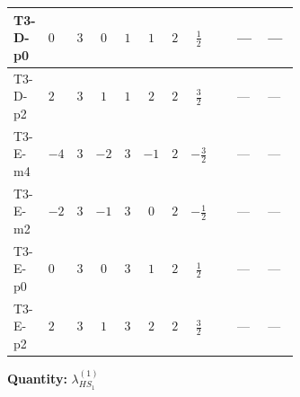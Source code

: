 \documentclass[8pt]{article}
\begin{document}
\begin{landscape}
\begin{longtable}{@{}llcccccc >{\raggedright\arraybackslash}p{0.21\linewidth} >{\raggedright\arraybackslash}p{0.21\linewidth} >{\raggedright\arraybackslash}p{0.21\linewidth}@{}}
\midrule
T3-D-p0 & $0$ & $3$ & $0$ & $1$ & $1$ & $2$ & $\frac{1}{2}$ & \scriptsize\adjustbox{max width=\linewidth}{$\begin{gathered} +8 {\lambda_{HS_1}^{(1)}} {\lambda_{S_1}^{(1)}}\end{gathered}$} & --- & --- \\
\midrule
T3-D-p2 & $2$ & $3$ & $1$ & $1$ & $2$ & $2$ & $\frac{3}{2}$ & \scriptsize\adjustbox{max width=\linewidth}{$\begin{gathered} +8 {\lambda_{HS_1}^{(1)}} {\lambda_{S_1}^{(1)}}\end{gathered}$} & --- & --- \\
\midrule
T3-E-m4 & $-4$ & $3$ & $-2$ & $3$ & $-1$ & $2$ & $-\frac{3}{2}$ & \scriptsize\adjustbox{max width=\linewidth}{$\begin{gathered} +8 {\lambda_{HS_1}^{(1)}} {\lambda_{S_1}^{(1)}}\end{gathered}$} & --- & --- \\
\midrule
T3-E-m2 & $-2$ & $3$ & $-1$ & $3$ & $0$ & $2$ & $-\frac{1}{2}$ & \scriptsize\adjustbox{max width=\linewidth}{$\begin{gathered} +8 {\lambda_{HS_1}^{(1)}} {\lambda_{S_1}^{(1)}}\end{gathered}$} & --- & --- \\
\midrule
T3-E-p0 & $0$ & $3$ & $0$ & $3$ & $1$ & $2$ & $\frac{1}{2}$ & \scriptsize\adjustbox{max width=\linewidth}{$\begin{gathered} +8 {\lambda_{HS_1}^{(1)}} {\lambda_{S_1}^{(1)}}\end{gathered}$} & --- & --- \\
\midrule
T3-E-p2 & $2$ & $3$ & $1$ & $3$ & $2$ & $2$ & $\frac{3}{2}$ & \scriptsize\adjustbox{max width=\linewidth}{$\begin{gathered} +8 {\lambda_{HS_1}^{(1)}} {\lambda_{S_1}^{(1)}}\end{gathered}$} & --- & --- \\
\midrule
\bottomrule
\end{longtable}
\clearpage
\noindent\textbf{Quantity: }$\lambda_{HS_1}^{(1)}$\par\smallskip

\end{landscape}
\end{document}
